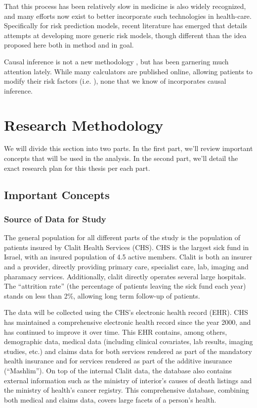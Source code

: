 \documentclass[a4paper,12pt]{article}
\begin{document}
	That this process has been relatively slow in medicine is also widely recognized, and many efforts now exist to better incorporate such technologies in health-care\cite{Obermeyer2016}. Specifically for risk prediction models, recent literature has emerged that details attempts at developing more generic risk models, though different than the idea proposed here both in method and in goal\cite{Rajkomar2018}.
	
	Causal inference is not a new methodology \cite{GuidoWImbens2015,StephenL.Morgan2015}, but has been garnering much attention lately\cite{JudeaPearl2018}. While many calculators are published online, allowing patients to modify their risk factors (i.e. \cite{NHS2016}), none that we know of incorporates causal inference.
	
	\section{Research Methodology}
	We will divide this section into two parts. In the first part, we'll review important concepts that will be used in the analysis. In the second part, we'll detail the exact research plan for this thesis per each part.
	
	\subsection{Important Concepts}
	
		\subsubsection{Source of Data for Study}
		The general population for all different parts of the study is the population of patients insured by Clalit Health Services (CHS). CHS is the largest sick fund in Israel, with an insured population of 4.5 active members. Clalit is both an insurer and a provider, directly providing primary care, specialist care, lab, imaging and pharamacy services. Additionally, clalit directly operates several large hospitals. The “attrition rate” (the percentage of patients leaving the sick fund each year) stands on less than 2\%, allowing long term follow-up of patients.
		
		The data will be collected using the CHS's electronic health record (EHR). CHS has maintained a comprehensive electronic health record since the year 2000, and has continued to improve it over time. This EHR contains, among others, demographic data, medical data (including clinical covariates, lab results, imaging studies, etc.) and claims data for both services rendered as part of the mandatory health insurance and for services rendered as part of the additive insurance (“Mashlim”). On top of the internal Clalit data, the database also contains external information such as the ministry of interior's causes of death listings and the ministry of health's cancer registry. This comprehensive database, combining both medical and claims data, covers large facets of a person's health.
		
\end{document}
